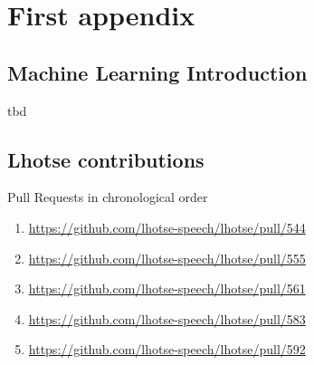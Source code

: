 \documentclass[bsc,frontabs,parskip,deptreport]{infthesis}
\begin{document}
\chapter{First appendix}
\section{Machine Learning Introduction}\label{sec:ml-intro}
tbd 

\section{Lhotse contributions} \label{app:lhotse-contrib}
Pull Requests in chronological order 
\begin{enumerate}
    \item \url{https://github.com/lhotse-speech/lhotse/pull/544}
    \item \url{https://github.com/lhotse-speech/lhotse/pull/555}
    \item \url{https://github.com/lhotse-speech/lhotse/pull/561}
    \item \url{https://github.com/lhotse-speech/lhotse/pull/583}
    \item \url{https://github.com/lhotse-speech/lhotse/pull/592}
\end{enumerate}
%
\end{document}
